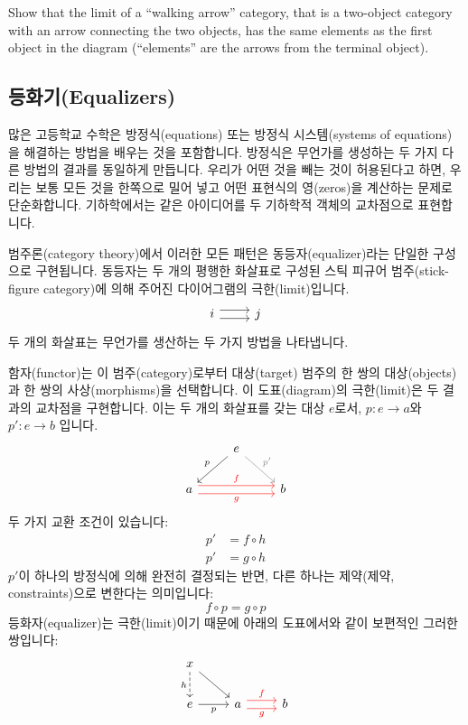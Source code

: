 \documentclass[DaoFP]{subfiles}
\begin{document}
\begin{exercise}
Show that the limit of a ``walking arrow'' category, that is a two-object category with an arrow connecting the two objects, has the same elements as the first object in the diagram (``elements'' are the arrows from the terminal object).
\end{exercise}

\subsection{등화기(Equalizers)}

많은 고등학교 수학은 방정식(equations) 또는 방정식 시스템(systems of equations)을 해결하는 방법을 배우는 것을 포함합니다.
방정식은 무언가를 생성하는 두 가지 다른 방법의 결과를 동일하게 만듭니다.
우리가 어떤 것을 빼는 것이 허용된다고 하면, 우리는 보통 모든 것을 한쪽으로 밀어 넣고 어떤 표현식의 영(zeros)을 계산하는 문제로 단순화합니다.
기하학에서는 같은 아이디어를 두 기하학적 객체의 교차점으로 표현합니다.


범주론(category theory)에서 이러한 모든 패턴은 동등자(equalizer)라는 단일한 구성으로 구현됩니다. 동등자는 두 개의 평행한 화살표로 구성된 스틱 피규어 범주(stick-figure category)에 의해 주어진 다이어그램의 극한(limit)입니다.
\[
\begin{tikzcd}
i \arrow[r, shift left=0.75ex]
  \arrow[r, shift right=0.75ex]
&
j
\end{tikzcd}
\]
두 개의 화살표는 무언가를 생산하는 두 가지 방법을 나타냅니다.

함자(functor)는 이 범주(category)로부터 대상(target) 범주의 한 쌍의 대상(objects)과 한 쌍의 사상(morphisms)을 선택합니다. 이 도표(diagram)의 극한(limit)은 두 결과의 교차점을 구현합니다. 이는 두 개의 화살표를 갖는 대상 $e$로서, $p \colon e \to a$와 $p' \colon e \to b$ 입니다.
\[
\begin{tikzcd}
& e
\arrow[dl, "p"']
\arrow[dr, gray, "p'"]
\\
a 
\arrow[rr, red, shift left=.75ex, "f"]
\arrow[rr, red, shift right=.75ex, "g"']
&&
b
\end{tikzcd}
\]
두 가지 교환 조건이 있습니다:
\begin{align*}
p' &= f \circ h \\
p' &= g \circ h
\end{align*}
$p'$이 하나의 방정식에 의해 완전히 결정되는 반면, 다른 하나는 제약(제약, constraints)으로 변한다는 의미입니다:
\[ f \circ p = g \circ p \]
등화자(equalizer)는 극한(limit)이기 때문에 아래의 도표에서와 같이 보편적인 그러한 쌍입니다:
\[
\begin{tikzcd}
x
\arrow[d, dashed, "h"']
\arrow[dr, ""]
\\
e
\arrow[r, "p"']
&
a \arrow[r, red, shift left=0.75ex, "f"]
  \arrow[r, red, shift right=0.75ex, "g"']
&
b
\end{tikzcd}
\]
\end{document}
